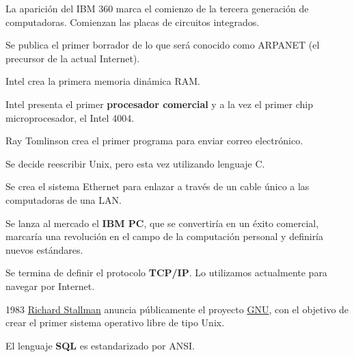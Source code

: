 \begin{description}
    \item[1964] La aparición del IBM 360 marca el comienzo de la tercera generación de computadoras. Comienzan las placas de circuitos integrados.

    \item[1969] Se publica el primer borrador de lo que será conocido como ARPANET (el precursor de la actual Internet).

    \item[1970] Intel crea la primera memoria dinámica RAM.

    \item[1971] Intel presenta el primer \textbf{procesador comercial} y a la vez el primer chip microprocesador, el Intel 4004.

    \item[1971] Ray Tomlinson crea el primer programa para enviar correo electrónico.

    \item[1972] Se decide reescribir Unix, pero esta vez utilizando lenguaje C.

    \item[1974] Se crea el sistema Ethernet para enlazar a través de un cable único a las computadoras de una LAN.

    \item[1981] Se lanza al mercado el \textbf{IBM PC}, que se convertiría en un éxito comercial, marcaría una revolución en el campo de la computación personal y definiría nuevos estándares.

    \item[1981] Se termina de definir el protocolo \textbf{TCP/IP}. Lo utilizamos actualmente para navegar por Internet.

    \vspace{10pt}
    \begin{minipage}{0.75\linewidth}
        \item[1983] \href{https://es.wikipedia.org/wiki/Richard_Stallman}{Richard Stallman} anuncia públicamente el proyecto \href{https://es.wikipedia.org/wiki/GNU}{GNU}, con el objetivo de crear el primer sistema operativo libre de tipo Unix.
    \end{minipage}
    \hfill
    \begin{minipage}{0.15\linewidth}
        \hfill
        
    \end{minipage}

    \item[1986] El lenguaje \textbf{SQL} es estandarizado por ANSI.


\end{description}
